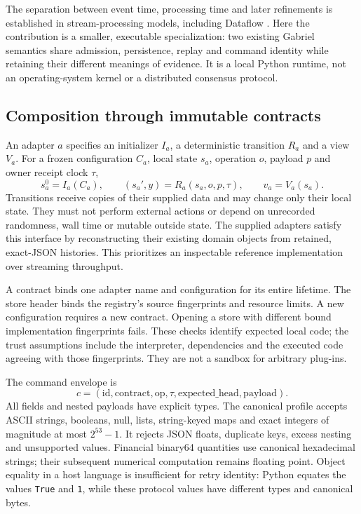 \documentclass[11pt,a4paper]{article}
\theoremstyle{definition}\newtheorem{definition}[theorem]{Definition}
\begin{document}
The separation between event time, processing time and later refinements is established in stream-processing models, including Dataflow \cite{akidau2015dataflow}. Here the contribution is a smaller, executable specialization: two existing Gabriel semantics share admission, persistence, replay and command identity while retaining their different meanings of evidence. It is a local Python runtime, not an operating-system kernel or a distributed consensus protocol.

\subsection{Composition through immutable contracts}
An adapter $a$ specifies an initializer $I_a$, a deterministic transition $R_a$ and a view $V_a$. For a frozen configuration $C_a$, local state $s_a$, operation $o$, payload $p$ and owner receipt clock $\tau$,
\begin{equation}
 s_a^0=I_a(C_a),\qquad
 (s_a',y)=R_a(s_a,o,p,\tau),\qquad v_a=V_a(s_a).
 \label{eq:runtimeadapter}
\end{equation}
Transitions receive copies of their supplied data and may change only their local state. They must not perform external actions or depend on unrecorded randomness, wall time or mutable outside state. The supplied adapters satisfy this interface by reconstructing their existing domain objects from retained, exact-JSON histories. This prioritizes an inspectable reference implementation over streaming throughput.

A contract binds one adapter name and configuration for its entire lifetime. The store header binds the registry's source fingerprints and resource limits. A new configuration requires a new contract. Opening a store with different bound implementation fingerprints fails. These checks identify expected local code; the trust assumptions include the interpreter, dependencies and the executed code agreeing with those fingerprints. They are not a sandbox for arbitrary plug-ins.

The command envelope is
\begin{equation}
 c=(\mathrm{id},\mathrm{contract},\mathrm{op},\tau,
       \mathrm{expected\_head},\mathrm{payload}).
 \label{eq:runtimecommand}
\end{equation}
All fields and nested payloads have explicit types. The canonical profile accepts ASCII strings, booleans, null, lists, string-keyed maps and exact integers of magnitude at most $2^{53}-1$. It rejects JSON floats, duplicate keys, excess nesting and unsupported values. Financial binary64 quantities use canonical hexadecimal strings; their subsequent numerical computation remains floating point. Object equality in a host language is insufficient for retry identity: Python equates the values \texttt{True} and \texttt{1}, while these protocol values have different types and canonical bytes.
\end{document}
